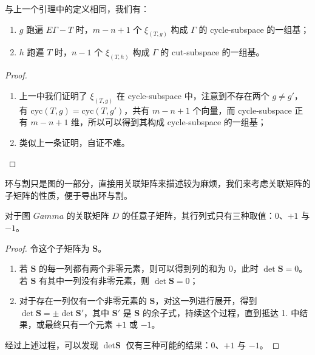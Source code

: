 \begin{theorem}
与上一个引理中的定义相同，我们有：
\begin{enumerate}
    \item $g$ 跑遍 $E\Gamma - T$ 时，$m - n + 1$ 个 $\xi_{(T,g)}$ 构成 $\Gamma$ 的 cycle-subspace 的一组基；
    \item $h$ 跑遍 $T$ 时，$n - 1$ 个 $\xi_{(T,h)}$ 构成 $\Gamma$ 的 cut-subspace 的一组基。
\end{enumerate}
\end{theorem}
\begin{proof}
\begin{enumerate}
    \item 上一中我们证明了 $\xi_{(T,g)}$ 在 cycle-subspace 中，注意到不存在两个 $g\neq g'$，有 $\text{cyc}(T,g) = \text{cyc}(T,g')$，共有 $m - n + 1$ 个向量，而 cycle-subspace 正有 $m - n + 1$ 维，所以可以得到其构成 cycle-subspace 的一组基；
    \item 类似上一条证明，自证不难。
\end{enumerate}
\end{proof}

环与割只是图的一部分，直接用关联矩阵来描述较为麻烦，我们来考虑关联矩阵的子矩阵的性质，便于导出环与割。

\begin{proposition}[Poincare 1901]
对于图 $Gamma$ 的关联矩阵 $D$ 的任意子矩阵，其行列式只有三种取值：$0$、$+1$ 与 $-1$。
\end{proposition}
\begin{proof}
令这个子矩阵为 $\textbf{S}$。
\begin{enumerate}
    \item 若 $\textbf{S}$ 的每一列都有两个非零元素，则可以得到列的和为 $0$，此时 $\det \textbf{S} = 0$。若 $\textbf{S}$ 有其中一列没有非零元素，则 $\det\textbf{S} = 0$；
    \item 对于存在一列仅有一个非零元素的 $\textbf{S}$，对这一列进行展开，得到 $\det\textbf{S} = \pm \det\textbf{S}'$，其中 $\textbf{S}'$ 是 $\textbf{S}$ 的余子式，持续这个过程，直到抵达 1. 中结果，或最终只有一个元素 $+1$ 或 $-1$。
\end{enumerate}
经过上述过程，可以发现 $\det\textbf{S}$ 仅有三种可能的结果：$0$、$+1$ 与 $-1$。
\end{proof}


